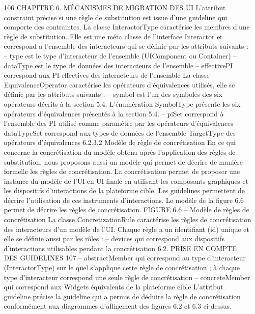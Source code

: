\documentclass{article}
\begin{document}
106
CHAPITRE 6. MÉCANISMES DE MIGRATION DES UI
L’attribut constraint pr\'{e}cise si une r\`{e}gle de substitution est issue d’une guideline qui comporte des
contraintes.
La classe InteractorType
caract\'{e}rise les membres d’une r\`{e}gle de substitution. Elle est une m\'{e}ta
classe de l’interface Interactor et correspond a l’ensemble des interacteurs qui se d\'{e}ﬁnie par les attributs suivants :
– type est le type d’interacteur de l’ensemble (UIComponent ou Container)
– dataType est le type de donn\'{e}es des interacteurs de l’ensemble
– effectivePI correspond aux PI effectives des interacteurs de l’ensemble
La classe EquivalenceOperator
caract\'{e}rise les op\'{e}rateurs d’\'{e}quivalences utilis\'{e}s, elle se d\'{e}ﬁnie
par les attributs suivants :
– symbol est l’un des symboles des six op\'{e}rateurs d\'{e}crits \`{a} la section 5.4. L’\'{e}num\'{e}ration SymbolType pr\'{e}sente les six op\'{e}rateurs d’\'{e}quivalences pr\'{e}sent\'{e}s \`{a} la section 5.4.
– piSet correspond \`{a} l’ensemble des PI utilis\'{e} comme param\`{e}tre par les op\'{e}rateurs d’\'{e}quivalences
– dataTypeSet correspond aux types de donn\'{e}es de l’ensemble TargetType des op\'{e}rateurs d’\'{e}quivalences
6.2.3.2
Mod\`{e}le de r\`{e}gle de concr\'{e}tisation
En ce qui concerne la concr\'{e}tisation du mod\`{e}le obtenu apr\`{e}s l’application des r\`{e}gles de substitution, nous proposons aussi un mod\`{e}le qui permet de d\'{e}crire de mani\`{e}re formelle les r\`{e}gles de
concr\'{e}tisation. La concr\'{e}tisation permet de proposer une instance du mod\`{e}le de l’UI en UI ﬁnale en
utilisant les composants graphiques et les dispositifs d’interactions de la plateforme cible. Les guidelines permettent de d\'{e}crire l’utilisation de ces instruments d’interactions. Le mod\`{e}le de la ﬁgure 6.6
permet de d\'{e}crire les r\`{e}gles de concr\'{e}tisation.
FIGURE 6.6 – Mod\`{e}le de r\`{e}gles de concr\'{e}tisation
La classe ConcretizationRule
caract\'{e}rise les r\`{e}gles de concr\'{e}tisation des interacteurs d’un mod\`{e}le
de l’UI. Chaque r\`{e}gle a un identiﬁant (id) unique et elle se d\'{e}ﬁnie aussi par les r\^{o}les :
– devices qui correspond aux dispositifs d’interactions utilisables pendant la concr\'{e}tisation
6.2. PRISE EN COMPTE DES GUIDELINES
107
– abstractMember qui correspond au type d’interacteur (InteractorType) sur le quel s’applique
cette r\`{e}gle de concr\'{e}tisation ; \`{a} chaque type d’interacteur correspond une seule r\`{e}gle de concr\'{e}tisation
– concreteMember qui correspond aux Widgets \'{e}quivalents de la plateforme cible
L’attribut guideline pr\'{e}cise la guideline qui a permis de d\'{e}duire la r\`{e}gle de concr\'{e}tisation conform\'{e}ment aux diagrammes d’afﬁnement des ﬁgures 6.2 et 6.3 ci-dessus.
\end{document}
